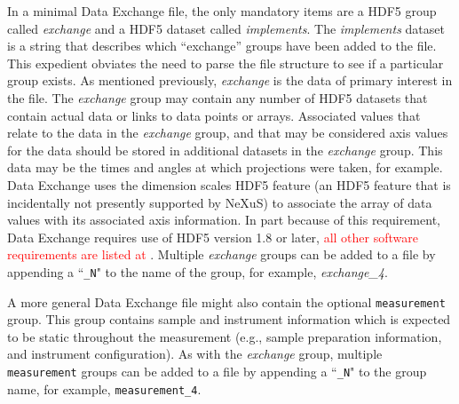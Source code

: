 \documentclass[pdf]{iucr}              %
\begin{document}
In a minimal Data Exchange file, the only mandatory items are a HDF5 group called \emph{exchange} and a HDF5 dataset called \emph{implements}. The \emph{implements} dataset is a string that describes which ``exchange'' groups have been added to the file. This expedient obviates the need to parse the file structure to see if a particular group exists. As mentioned previously, \emph{exchange} is the data of primary interest in the file.  The \emph{exchange} group may contain any number of HDF5 datasets that contain actual data or links to data points or arrays. Associated values that relate to the data in the \emph{exchange} group, and that may be considered axis values for the data should be stored in additional datasets in the \emph{exchange} group. This data may be the times and angles at which projections were taken, for example. Data Exchange uses the dimension scales HDF5 feature (an HDF5 feature that is incidentally not presently supported by NeXuS) to associate the array of data values with its associated axis information. In part because of this requirement, Data Exchange requires use of HDF5 version 1.8 or later, \textcolor{red}{all other software requirements are listed at \cite{data_exchange}}. Multiple \emph{exchange} groups can be added to a file by appending a ``\texttt{\_N}" to the name of the group, for example, \emph{exchange\_4}.

A more general Data Exchange file might also contain the optional \texttt{measurement} group. This group contains sample and instrument information which is expected to be static throughout the measurement (e.g., sample preparation information, and instrument configuration). As with the \emph{exchange} group, multiple \texttt{measurement} groups can be added to a file by appending a ``\texttt{\_N}" to the group name, for example, \texttt{measurement\_4}.
\end{document}
